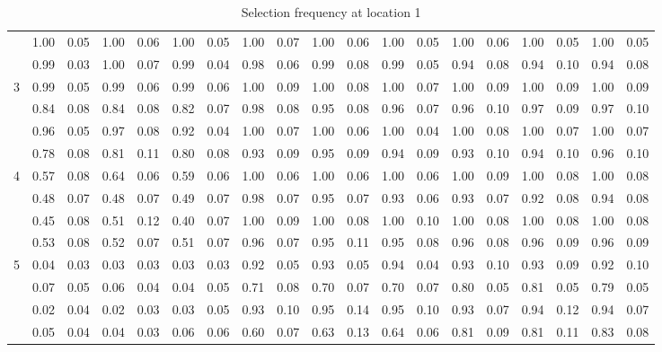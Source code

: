 \documentclass[authoryear, review, 11pt]{elsarticle}
\begin{document}
\begin{table}
\begin{center}
\begin{tabular}{ccc|cc|cc|cc|cc|cc|cc|cc|cc}
		  & 1.00 & 0.05 & 1.00 & 0.06 & 1.00 & 0.05 & 1.00 & 0.07 & 1.00 & 0.06 & 1.00 & 0.05 & 1.00 & 0.06 & 1.00 & 0.05 & 1.00 & 0.05 \\ 
		  & 0.99 & 0.03 & 1.00 & 0.07 & 0.99 & 0.04 & 0.98 & 0.06 & 0.99 & 0.08 & 0.99 & 0.05 & 0.94 & 0.08 & 0.94 & 0.10 & 0.94 & 0.08 \\ 
		  \cline{2-19}
		  \multirow{4}{*}{3} & 0.99 & 0.05 & 0.99 & 0.06 & 0.99 & 0.06 & 1.00 & 0.09 & 1.00 & 0.08 & 1.00 & 0.07 & 1.00 & 0.09 & 1.00 & 0.09 & 1.00 & 0.09 \\ 
		  & 0.84 & 0.08 & 0.84 & 0.08 & 0.82 & 0.07 & 0.98 & 0.08 & 0.95 & 0.08 & 0.96 & 0.07 & 0.96 & 0.10 & 0.97 & 0.09 & 0.97 & 0.10 \\ 
		  & 0.96 & 0.05 & 0.97 & 0.08 & 0.92 & 0.04 & 1.00 & 0.07 & 1.00 & 0.06 & 1.00 & 0.04 & 1.00 & 0.08 & 1.00 & 0.07 & 1.00 & 0.07 \\ 
		  & 0.78 & 0.08 & 0.81 & 0.11 & 0.80 & 0.08 & 0.93 & 0.09 & 0.95 & 0.09 & 0.94 & 0.09 & 0.93 & 0.10 & 0.94 & 0.10 & 0.96 & 0.10 \\ 
		  \cline{2-19}
		  \multirow{4}{*}{4} & 0.57 & 0.08 & 0.64 & 0.06 & 0.59 & 0.06 & 1.00 & 0.06 & 1.00 & 0.06 & 1.00 & 0.06 & 1.00 & 0.09 & 1.00 & 0.08 & 1.00 & 0.08 \\ 
		  & 0.48 & 0.07 & 0.48 & 0.07 & 0.49 & 0.07 & 0.98 & 0.07 & 0.95 & 0.07 & 0.93 & 0.06 & 0.93 & 0.07 & 0.92 & 0.08 & 0.94 & 0.08 \\ 
		  & 0.45 & 0.08 & 0.51 & 0.12 & 0.40 & 0.07 & 1.00 & 0.09 & 1.00 & 0.08 & 1.00 & 0.10 & 1.00 & 0.08 & 1.00 & 0.08 & 1.00 & 0.08 \\ 
		  & 0.53 & 0.08 & 0.52 & 0.07 & 0.51 & 0.07 & 0.96 & 0.07 & 0.95 & 0.11 & 0.95 & 0.08 & 0.96 & 0.08 & 0.96 & 0.09 & 0.96 & 0.09 \\
		  \cline{2-19}
		  \multirow{4}{*}{5} & 0.04 & 0.03 & 0.03 & 0.03 & 0.03 & 0.03 & 0.92 & 0.05 & 0.93 & 0.05 & 0.94 & 0.04 & 0.93 & 0.10 & 0.93 & 0.09 & 0.92 & 0.10 \\ 
		  & 0.07 & 0.05 & 0.06 & 0.04 & 0.04 & 0.05 & 0.71 & 0.08 & 0.70 & 0.07 & 0.70 & 0.07 & 0.80 & 0.05 & 0.81 & 0.05 & 0.79 & 0.05 \\ 
		  & 0.02 & 0.04 & 0.02 & 0.03 & 0.03 & 0.05 & 0.93 & 0.10 & 0.95 & 0.14 & 0.95 & 0.10 & 0.93 & 0.07 & 0.94 & 0.12 & 0.94 & 0.07 \\ 
		  & 0.05 & 0.04 & 0.04 & 0.03 & 0.06 & 0.06 & 0.60 & 0.07 & 0.63 & 0.13 & 0.64 & 0.06 & 0.81 & 0.09 & 0.81 & 0.11 & 0.83 & 0.08 \\ 
		  \end{tabular}
		\caption{Selection frequency at location 1\label{table:loc1-selection}}
		\end{center}
		\end{table}
		
\end{document}
